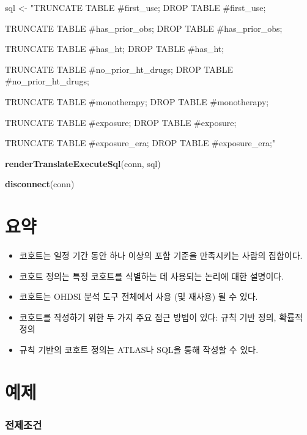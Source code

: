 \documentclass[10.5pt]{book}
\newenvironment{Shaded}{\begin{snugshade}}{\end{snugshade}}
\newcommand{\KeywordTok}[1]{\textcolor[rgb]{0.13,0.29,0.53}{\textbf{#1}}}
\newcommand{\StringTok}[1]{\textcolor[rgb]{0.31,0.60,0.02}{#1}}
\newcommand{\NormalTok}[1]{#1}
\theoremstyle{definition}
\theoremstyle{definition}
\theoremstyle{definition}
\theoremstyle{remark}
\let\BeginKnitrBlock\begin \let\EndKnitrBlock\end
\begin{document}
\begin{Shaded}
\begin{Highlighting}[]
\NormalTok{sql <-}\StringTok{ "TRUNCATE TABLE #first_use;}
\StringTok{DROP TABLE #first_use;}

\StringTok{TRUNCATE TABLE #has_prior_obs;}
\StringTok{DROP TABLE #has_prior_obs;}

\StringTok{TRUNCATE TABLE #has_ht;}
\StringTok{DROP TABLE #has_ht;}

\StringTok{TRUNCATE TABLE #no_prior_ht_drugs;}
\StringTok{DROP TABLE #no_prior_ht_drugs;}

\StringTok{TRUNCATE TABLE #monotherapy;}
\StringTok{DROP TABLE #monotherapy;}

\StringTok{TRUNCATE TABLE #exposure;}
\StringTok{DROP TABLE #exposure;}

\StringTok{TRUNCATE TABLE #exposure_era;}
\StringTok{DROP TABLE #exposure_era;"}

\KeywordTok{renderTranslateExecuteSql}\NormalTok{(conn, sql)}

\KeywordTok{disconnect}\NormalTok{(conn)}
\end{Highlighting}
\end{Shaded}

\section{요약}\label{-8}

\BeginKnitrBlock{rmdsummary}
\begin{itemize}
\item
  코호트는 일정 기간 동안 하나 이상의 포함 기준을 만족시키는 사람의
  집합이다.
\item
  코호트 정의는 특정 코호트를 식별하는 데 사용되는 논리에 대한 설명이다.
\item
  코호트는 OHDSI 분석 도구 전체에서 사용 (및 재사용) 될 수 있다.
\item
  코호트를 작성하기 위한 두 가지 주요 접근 방법이 있다: 규칙 기반 정의,
  확률적 정의
\item
  규칙 기반의 코호트 정의는 ATLAS나 SQL을 통해 작성할 수 있다.
\end{itemize}
\EndKnitrBlock{rmdsummary}

\section{예제}\label{-5}

\subsubsection*{전제조건}\label{-2}
\end{document}
